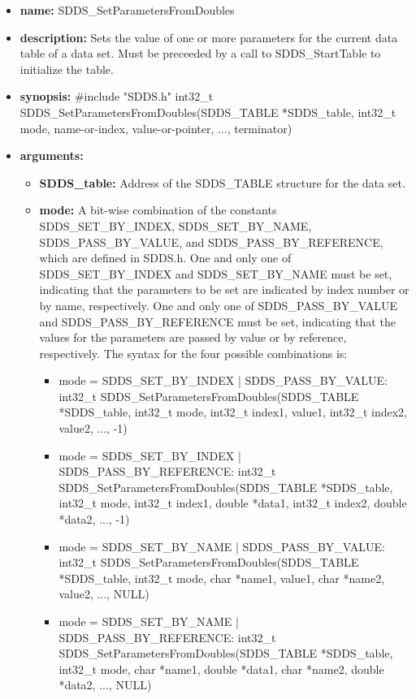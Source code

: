 \documentclass[11pt]{article}
\begin{document}
\begin{itemize}
\item {\bf name:}\newline
SDDS\_SetParametersFromDoubles
\item {\bf description:}\newline
Sets the value of one or more parameters for the current data table of a data set. Must be preceeded by a call to SDDS\_StartTable to initialize the table.
\item {\bf synopsis:} \#include "SDDS.h"\newline
int32\_t SDDS\_SetParametersFromDoubles(SDDS\_TABLE *SDDS\_table, int32\_t mode,  name-or-index,  value-or-pointer, ...,  terminator)
\item {\bf arguments:}
\begin{itemize}
\item {\bf SDDS\_table:} Address of the SDDS\_TABLE structure for the data set.
\item {\bf mode:} A bit-wise combination of the constants SDDS\_SET\_BY\_INDEX, SDDS\_SET\_BY\_NAME, SDDS\_PASS\_BY\_VALUE, and SDDS\_PASS\_BY\_REFERENCE, which are defined in  SDDS.h. One and only one of SDDS\_SET\_BY\_INDEX and SDDS\_SET\_BY\_NAME must be set, indicating that the parameters to be set are indicated by index number or by name, respectively. One and only one of SDDS\_PASS\_BY\_VALUE and SDDS\_PASS\_BY\_REFERENCE must be set, indicating that the values for the parameters are passed by value or by reference, respectively. The syntax for the four possible combinations is:
\begin{itemize}
\item mode = SDDS\_SET\_BY\_INDEX | SDDS\_PASS\_BY\_VALUE: int32\_t SDDS\_SetParametersFromDoubles(SDDS\_TABLE *SDDS\_table, int32\_t mode, int32\_t index1,  value1, int32\_t index2,  value2, ..., -1)
\item mode = SDDS\_SET\_BY\_INDEX | SDDS\_PASS\_BY\_REFERENCE: int32\_t SDDS\_SetParametersFromDoubles(SDDS\_TABLE *SDDS\_table, int32\_t mode, int32\_t index1, double *data1, int32\_t index2, double *data2, ..., -1)
\item mode = SDDS\_SET\_BY\_NAME | SDDS\_PASS\_BY\_VALUE: int32\_t SDDS\_SetParametersFromDoubles(SDDS\_TABLE *SDDS\_table, int32\_t mode, char *name1,  value1, char *name2,  value2, ..., NULL)
\item mode = SDDS\_SET\_BY\_NAME | SDDS\_PASS\_BY\_REFERENCE: int32\_t SDDS\_SetParametersFromDoubles(SDDS\_TABLE *SDDS\_table, int32\_t mode, char *name1, double *data1, char *name2, double *data2, ..., NULL)  

\end{itemize}
\end{itemize}
\end{itemize}
\end{document}
